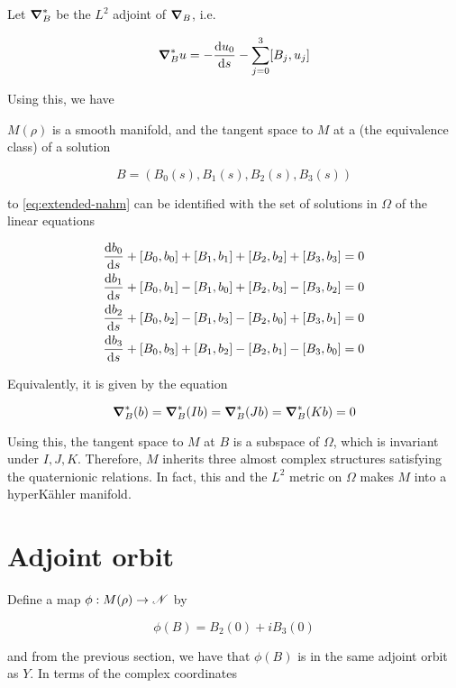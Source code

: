 \documentclass{report}
\begin{document}
Let \(\grad_B^*\) be the \(L^2\) adjoint of \(\grad_B\), i.e.

\[\grad_B^*u = - \dv{u_0}{s} - \sum_{j=0}^3[B_j, u_j]\]

Using this, we have

\begin{proposition}
    \label{prop:tangent-space} \(M(\rho)\) is a smooth manifold, and the tangent space to \(M\) at a (the equivalence class) of a solution 
    
    \[B = (B_0(s), B_1(s), B_2(s), B_3(s))\] 
    
    to \cref{eq:extended-nahm} can be identified with the set of solutions in \(\Omega\) of the linear equations

    \begin{equation}
        \label{eq:tangent-space}
        \begin{split}
            \dv{b_0}{s} + [B_0, b_0] + [B_1, b_1] + [B_2, b_2] + [B_3, b_3] &= 0 \\
            \dv{b_1}{s} + [B_0, b_1] - [B_1, b_0] + [B_2, b_3] - [B_3, b_2] &= 0 \\
            \dv{b_2}{s} + [B_0, b_2] - [B_1, b_3] - [B_2, b_0] + [B_3, b_1] &= 0 \\
            \dv{b_3}{s} + [B_0, b_3] + [B_1, b_2] - [B_2, b_1] - [B_3, b_0] &= 0
        \end{split}
    \end{equation}

    Equivalently, it is given by the equation

    \[\grad^*_B(b) = \grad^*_B(Ib) = \grad^*_B(Jb) = \grad^*_B(Kb) = 0\]
\end{proposition}

Using this, the tangent space to \(M\) at \(B\) is a subspace of \(\Omega\), which is invariant under \(I, J, K\). Therefore, \(M\) inherits three almost complex structures satisfying the quaternionic relations. In fact, this and the \(L^2\) metric on \(\Omega\) makes \(M\) into a hyperK\"ahler manifold.

\section{Adjoint orbit}

Define a map \(\phi : M(\rho) \to \mathscr{N}\) by

\[\phi(B) = B_2(0) + iB_3(0)\]

and from the previous section, we have that \(\phi(B)\) is in the same adjoint orbit as \(Y\). In terms of the complex coordinates
\end{document}
